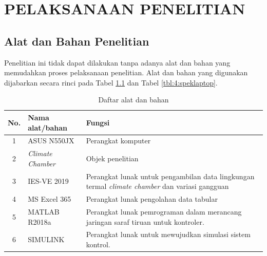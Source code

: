 \chapter{PELAKSANAAN PENELITIAN}
\label{pelaksanaan-penelitian}

\section{Alat dan Bahan Penelitian}
Penelitian ini tidak dapat dilakukan tanpa adanya alat dan bahan yang memudahkan proses pelaksanaan penelitian. Alat dan bahan yang digunakan dijabarkan secara rinci pada Tabel \ref{tbl:4:alatbahan} dan Tabel \ref{tbl:4:speklaptop}.

\vspace{2em}
\begin{table}[!h]
	\caption{Daftar alat dan bahan}
	\label{tbl:4:alatbahan}
	\centering
	\begin{tabular}{|c|p{3.6cm}|p{9cm}|}
		\hline
		No. & Nama alat/bahan & Fungsi \\
		\hline
		1 & ASUS N550JX & Perangkat komputer \\ \hline
		2 & \textit{Climate Chamber} & Objek penelitian \\ \hline
		3 & IES-VE 2019 & Perangkat lunak untuk pengambilan data lingkungan termal \textit{climate chamber} dan variasi gangguan \\ \hline
		4 & MS Excel 365 & Perangkat lunak pengolahan data tabular \\ \hline
		5 & MATLAB R2018a & Perangkat lunak pemrograman dalam merancang jaringan saraf tiruan untuk kontroler. \\ \hline
		6 & SIMULINK & Perangkat lunak untuk mewujudkan simulasi sistem kontrol. \\ \hline
	\end{tabular}
\end{table}


